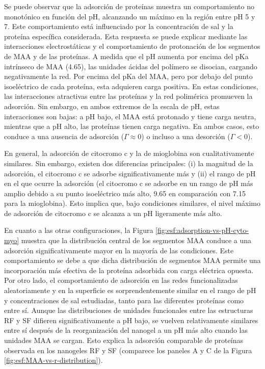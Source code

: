  Se puede observar que la adsorci\'on de prote\'inas muestra un comportamiento no monot\'onico en funci\'on del pH, alcanzando un m\'aximo en la regi\'on entre pH 5 y 7. Este comportamiento est\'a influenciado por la concentraci\'on de sal y la prote\'ina espec\'ifica considerada. Esta respuesta se puede explicar mediante las interacciones electrost\'aticas y el comportamiento de protonaci\'on de los segmentos de MAA y de las prote\'inas. A medida que el pH aumenta por encima del pKa intr\'inseco de MAA (4.65), las unidades \'acidas del pol\'imero se disocian, cargando negativamente la red. Por encima del pKa del MAA, pero por debajo del punto isoel\'ectrico de cada prote\'ina, esta adquieren carga positiva. En estas condiciones, las interacciones atractivas entre las prote\'inas y la red polim\'erica promueven la adsorci\'on. Sin embargo, en ambos extremos de la escala de pH, estas interacciones son bajas: a pH bajo, el MAA est\'a protonado y tiene carga neutra, mientras que a pH alto, las prote\'inas tienen carga negativa. En ambos casos, esto conduce a una ausencia de adsorci\'on ($\Gamma \approx 0$) o incluso a una desorci\'on ($\Gamma < 0$).
 
 
En general, la adsorci\'on de citocromo c y la de mioglobina son cualitativamente similares. Sin embargo, existen dos diferencias principales: (i) la magnitud de la adsorci\'on, el citocromo c se adsorbe significativamente m\'as y (ii) el rango de pH en el que ocurre la adsorci\'on (el citocromo c se adsorbe en un rango de pH m\'as amplio debido a su punto isoel\'ectrico m\'as alto, 9.65 en comparaci\'on con 7.15 para la mioglobina). Esto implica que, bajo condiciones similares, el nivel m\'aximo de adsorci\'on de citocromo c se alcanza a un pH ligeramente m\'as alto.

En cuanto a las otras configuraciones, la Figura \ref{fig:esf:adsorption-vs-pH-cyto-myo} muestra que la distribuci\'on central de los segmentos MAA conduce a una adsorci\'on significativamente mayor en la mayor\'ia de las condiciones. Este comportamiento se debe a que dicha distribuci\'on de segmentos MAA permite una incorporaci\'on m\'as efectiva de la prote\'ina adsorbida con carga el\'ectrica opuesta. Por otro lado, el comportamiento de adsorci\'on en las redes funcionalizadas aleatoriamente y en la superficie es sorprendentemente similar en el rango de pH y concentraciones de sal estudiadas, tanto para las diferentes prote\'inas como entre s\'i. Aunque las distribuciones de unidades funcionales entre las estructuras RF y SF difieren significativamente a pH bajo, se vuelven relativamente similares entre s\'i despu\'es de la reorganizaci\'on del nanogel a un pH m\'as alto cuando las unidades MAA se cargan. Esto explica la adsorci\'on comparable de prote\'inas observada en los nanogeles RF y SF (comparece los paneles A y C de la Figura \ref{fig:esf:MAA-vs-r-distribution}).



